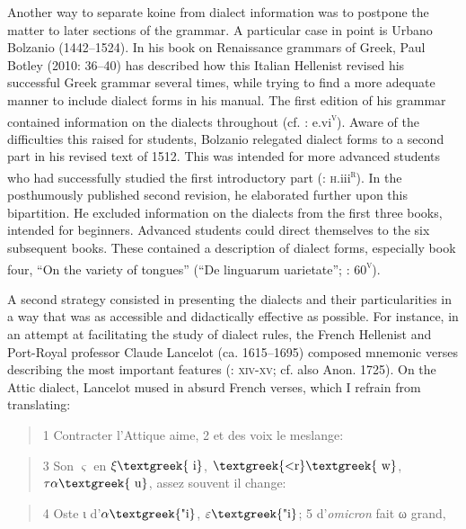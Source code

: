 Another way to separate koine from dialect information was to postpone the matter to later sections of the grammar. A particular case in point is Urbano Bolzanio (1442–1524). In his book on Renaissance grammars of Greek, Paul Botley (2010: 36–40) has described how this Italian Hellenist revised his successful Greek grammar several times, while trying to find a more adequate manner to include dialect forms in his manual. The first edition of his grammar contained information on the dialects throughout (cf. \citealt{Bolzanio1497}: e.vi\textsc{\textsuperscript{v}}). Aware of the difficulties this raised for students, Bolzanio relegated dialect forms to a second part in his revised text of 1512. This was intended for more advanced students who had successfully studied the first introductory part (\citealt{Bolzanio1512}: \textsc{h}.iii\textsc{\textsuperscript{r}}). In the posthumously published second revision, he elaborated further upon this bipartition. He excluded information on the dialects from the first three books, intended for beginners. Advanced students could direct themselves to the six subsequent books. These contained a description of dialect forms, especially book four, “On the variety of tongues” (“De linguarum uarietate”; \citealt{Bolzanio1545}: 60\textsc{\textsuperscript{v}}).

A second strategy consisted in presenting the dialects and their particularities in a way that was as accessible and didactically effective as possible. For instance, in an attempt at facilitating the study of dialect rules, the French Hellenist and Port-Royal professor Claude Lancelot (ca. 1615–1695) composed mnemonic verses describing the most important features (\citealt{Lancelot1655}: \textsc{xiv-xv;} cf. also Anon. 1725). On the Attic dialect, Lancelot mused in absurd French verses, which I refrain from translating:

\begin{quote}
1 Contracter l’Attique aime, 2 et des voix le meslange:
\end{quote}

\begin{quote}
3 Son $\varsigma $ en $\xi \text{\textgreek{~i}}$, $\text{\textgreek{<r}}\text{\textgreek{~w}}$, $\tau \alpha \text{\textgreek{~u}}$, assez souvent il change:
\end{quote}

\begin{quote}
4 Oste ι d’$\alpha \text{\textgreek{"i}}$, $\varepsilon \text{\textgreek{"i}}$; 5 d’\textit{omicron} fait ω grand,
\end{quote}

